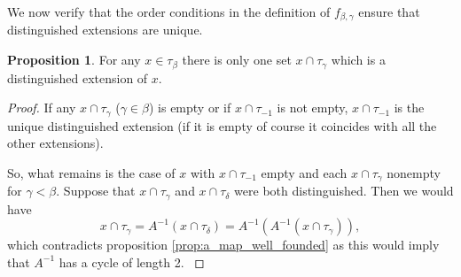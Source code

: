\documentclass{article}
\theoremstyle{definition}
\newtheorem{proposition}[theorem]{Proposition}
\theoremstyle{remark}
\newcommand{\ihref}[1]{(\textbf{I\ref{#1}})}
\begin{document}
We now verify that the order conditions in the definition of $f_{\beta,\gamma}$ ensure that distinguished extensions are unique.
\begin{proposition}\label{prop:distinguished_extension_unique}
{For any $x \in \tau_\beta$ there is only one set $x \cap \tau_\gamma$ which is a distinguished extension of $x$.}
\end{proposition}
\begin{proof}
If any $x \cap \tau_\gamma$ ($\gamma \in \beta$) is empty or if $x \cap \tau_{-1}$ is not empty, $x \cap \tau_{-1}$ is the unique distinguished extension
(if it is empty of course it coincides with all the other extensions).

So, what remains is the case of $x$ with $x \cap \tau_{-1}$ empty and each $x \cap \tau_\gamma$ nonempty for $\gamma<\beta$.
{
Suppose that $x \cap \tau_\gamma$ and $x \cap \tau_\delta$ were both distinguished.
Then we would have
$$ x \cap \tau_\gamma = A^{-1}(x \cap \tau_\delta) = A^{-1}(A^{-1}(x \cap \tau_\gamma)), $$
which contradicts proposition \ref{prop:a_map_well_founded} as this would imply that $A^{-1}$ has a cycle of length 2.
}
\begin{comment}
If $x \cap \tau_\gamma$ is an extension of $x$ and $a \in x \cap \tau_\gamma$ is not of the form $N_\gamma$ for a near-litter $N$, then
$x \cap \tau_\gamma$ must be the unique distinguished extension:  the reason for this is that for any distinguished extension, all elements $b \in x \cap \tau_\delta$ of other extensions must be $N_\delta$'s.

So we are down to the case where $x \cap \tau_\delta$ is nonempty for $\delta \neq -1$, $x \cap \tau_{-1}$ is empty, and each element of
any $x \cap \tau_\delta$ is of the form $N_\delta$ where $N$ is a near-litter.  Let $x \cap \tau_\gamma$ be a distinguished extension.
For any $M_\delta \in x$ with $\delta \neq \gamma$, we have $M \sim f_{\gamma,\delta}(P_\gamma,Q)$ for some near-litter $P$ and support $Q$
of $P_\gamma$.  Then we have $\iota_*(M) > \iota^+_*(P_\gamma,Q) \geq \iota_*(P)$ {by \ihref{ih:pos_typed_near_litter}}.  Let $N_\gamma\in x$ be chosen so that $\iota_*(N)$ is minimal.
It follows that for any $\delta \neq \gamma$ and $M_\delta \in x$ we have $\iota_*(M) > \iota_*(N)$, from which it is evident that we cannot have two distinct distinguished extensions:
if $\delta$ were the index of another distinguished extension, and $\iota_*(M)$ were chosen minimal so that $M_\delta \in x$, it would follow that $\iota_*(M)<\iota_*(N)$ as above
but also that $\iota_*(N) < \iota_*(M)$, which is absurd.
\end{comment}
\end{proof}
\end{document}
